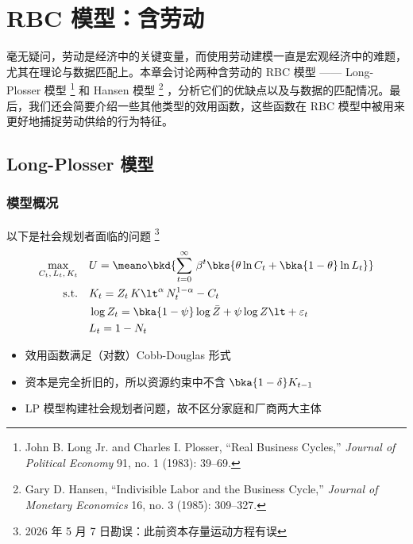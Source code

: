 

\ChapterGeometry

\chapter{RBC 模型：含劳动}\label{ch:05}

毫无疑问，劳动是经济中的关键变量，而使用劳动建模一直是宏观经济中的难题，尤其在理论与数据匹配上。本章会讨论两种含劳动的 RBC 模型 —— Long-Plosser 模型 \footnote{John B. Long Jr. and Charles I. Plosser, ``Real Business Cycles,'' \emph{Journal of Political Economy} 91, no. 1 (1983): 39--69.} 和 Hansen 模型 \footnote{Gary D. Hansen, ``Indivisible Labor and the Business Cycle,'' \emph{Journal of Monetary Economics} 16, no. 3 (1985): 309--327.} ，分析它们的优缺点以及与数据的匹配情况。最后，我们还会简要介绍一些其他类型的效用函数，这些函数在 RBC 模型中被用来更好地捕捉劳动供给的行为特征。

\section{Long-Plosser 模型}\label{sec:long-plosser}

\subsection{模型概况}\label{sec:chap05-model}

以下是社会规划者面临的问题 \footnote{2026 年 5 月 7 日勘误：此前资本存量运动方程有误}
\begin{align*}
    \max_{C_t,\,L_t,\,K_t}\quad & U=\meano\bkd{\sum_{t=0}^{\infty}\,\beta^t\bks{\theta\ln C_t+\bka{1-\theta}\ln L_t}}\\
    \text{s.t.}\quad & K_t=Z_t\,K\lt^\alpha\,N_t^{1-\alpha}-C_t\\
        & \log Z_t=\bka{1-\psi}\log\bar{Z}+\psi\log Z\lt+\varepsilon_t\\
        & L_t=1-N_t
\end{align*}
\begin{itemize}
    \item 效用函数满足（对数）Cobb-Douglas 形式
    \item 资本是完全折旧的，所以资源约束中不含 \(\bka{1-\delta}K_{t-1}\)
    \item LP 模型构建社会规划者问题，故不区分家庭和厂商两大主体
\end{itemize}

